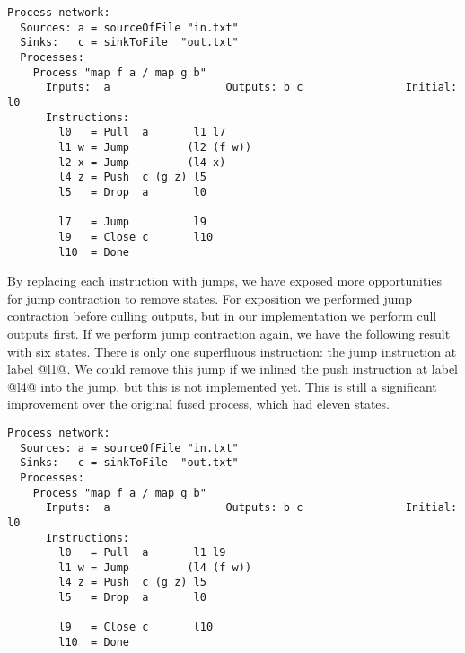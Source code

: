\begin{lstlisting}[linebackgroundcolor={
  \hilineFst{8}
  \hilineCom{9}
  \hilineFst{10}
  \hilineSnd{11}
  \hilineFst{12}
  \hilineFst{14}
  \hilineSnd{15}
  \hilineCom{16}
}]
Process network:
  Sources: a = sourceOfFile "in.txt"
  Sinks:   c = sinkToFile  "out.txt"
  Processes:
    Process "map f a / map g b"
      Inputs:  a                  Outputs: b c                Initial: l0
      Instructions:
        l0   = Pull  a       l1 l7
        l1 w = Jump         (l2 (f w))
        l2 x = Jump         (l4 x)
        l4 z = Push  c (g z) l5
        l5   = Drop  a       l0

        l7   = Jump          l9
        l9   = Close c       l10
        l10  = Done
\end{lstlisting}

By replacing each instruction with jumps, we have exposed more opportunities for jump contraction to remove states.
For exposition we performed jump contraction before culling outputs, but in our implementation we perform cull outputs first.
If we perform jump contraction again, we have the following result with six states.
There is only one superfluous instruction: the jump instruction at label @l1@.
We could remove this jump if we inlined the push instruction at label @l4@ into the jump, but this is not implemented yet.
This is still a significant improvement over the original fused process, which had eleven states.

\begin{lstlisting}[linebackgroundcolor={
  \hilineFst{8}
  \hilineCom{9}
  \hilineFst{10}
  \hilineFst{11}
  \hilineSnd{13}
  \hilineCom{14}
}]
Process network:
  Sources: a = sourceOfFile "in.txt"
  Sinks:   c = sinkToFile  "out.txt"
  Processes:
    Process "map f a / map g b"
      Inputs:  a                  Outputs: b c                Initial: l0
      Instructions:
        l0   = Pull  a       l1 l9
        l1 w = Jump         (l4 (f w))
        l4 z = Push  c (g z) l5
        l5   = Drop  a       l0

        l9   = Close c       l10
        l10  = Done
\end{lstlisting}

